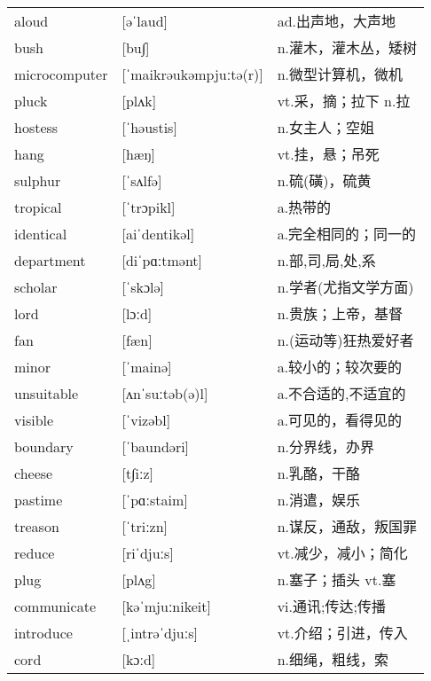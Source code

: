 \documentclass[a4paper]{article}
\begin{document}
\section{}
\begin{tabular}{l l l}

aloud & [əˈlaud] & ad.出声地，大声地 \\
bush & [bu∫] & n.灌木，灌木丛，矮树 \\
microcomputer & [ˈmaikrəukəmpjuːtə(r)] & n.微型计算机，微机 \\
pluck & [plʌk] & vt.采，摘；拉下 n.拉 \\
hostess & [ˈhəustis] & n.女主人；空姐 \\
hang & [hæŋ] & vt.挂，悬；吊死 \\
sulphur & [ˈsʌlfə] & n.硫(磺)，硫黄 \\
tropical & [ˈtrɔpikl] & a.热带的 \\
identical & [aiˈdentikəl] & a.完全相同的；同一的 \\
department & [diˈpɑːtmənt] & n.部,司,局,处,系 \\
scholar & [ˈskɔlə] & n.学者(尤指文学方面) \\
lord & [lɔːd] & n.贵族；上帝，基督 \\
fan & [fæn] & n.(运动等)狂热爱好者 \\
minor & [ˈmainə] & a.较小的；较次要的 \\
unsuitable & [ʌnˈsuːtəb(ə)l] & a.不合适的,不适宜的 \\
visible & [ˈvizəbl] & a.可见的，看得见的 \\
boundary & [ˈbaundəri] & n.分界线，办界 \\
cheese & [t∫iːz] & n.乳酪，干酪 \\
pastime & [ˈpɑːstaim] & n.消遣，娱乐 \\
treason & [ˈtriːzn] & n.谋反，通敌，叛国罪 \\
reduce & [riˈdjuːs] & vt.减少，减小；简化 \\
plug & [plʌg] & n.塞子；插头 vt.塞 \\
communicate & [kəˈmjuːnikeit] & vi.通讯;传达;传播 \\
introduce & [ˌintrəˈdjuːs] & vt.介绍；引进，传入 \\
cord & [kɔːd] & n.细绳，粗线，索 \\

\end{tabular}
\end{document}
